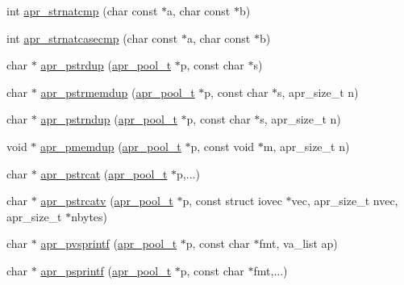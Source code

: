 \begin{DoxyCompactItemize}
\item 
int \hyperlink{group__apr__strings_gabe7e226c26e1535d787a7836b9c8d0a1}{apr\-\_\-strnatcmp} (char const $\ast$a, char const $\ast$b)
\item 
int \hyperlink{group__apr__strings_ga1708d51c4989934fec663b23366430f3}{apr\-\_\-strnatcasecmp} (char const $\ast$a, char const $\ast$b)
\item 
char $\ast$ \hyperlink{group__apr__strings_gabc79e99ff19abbd7cfd18308c5f85d47}{apr\-\_\-pstrdup} (\hyperlink{group__apr__pools_gaf137f28edcf9a086cd6bc36c20d7cdfb}{apr\-\_\-pool\-\_\-t} $\ast$p, const char $\ast$s)
\item 
char $\ast$ \hyperlink{group__apr__strings_ga0eae1185559578c0f9792413305eca25}{apr\-\_\-pstrmemdup} (\hyperlink{group__apr__pools_gaf137f28edcf9a086cd6bc36c20d7cdfb}{apr\-\_\-pool\-\_\-t} $\ast$p, const char $\ast$s, apr\-\_\-size\-\_\-t n)
\item 
char $\ast$ \hyperlink{group__apr__strings_gad17053ffe6604d908ae7cac33543a6b4}{apr\-\_\-pstrndup} (\hyperlink{group__apr__pools_gaf137f28edcf9a086cd6bc36c20d7cdfb}{apr\-\_\-pool\-\_\-t} $\ast$p, const char $\ast$s, apr\-\_\-size\-\_\-t n)
\item 
void $\ast$ \hyperlink{group__apr__strings_gac3886f14ecf5aed8fe4493087799685c}{apr\-\_\-pmemdup} (\hyperlink{group__apr__pools_gaf137f28edcf9a086cd6bc36c20d7cdfb}{apr\-\_\-pool\-\_\-t} $\ast$p, const void $\ast$m, apr\-\_\-size\-\_\-t n)
\item 
char $\ast$ \hyperlink{group__apr__strings_ga7bd80c95ffb7b3f96bc78e7b5b5b0045}{apr\-\_\-pstrcat} (\hyperlink{group__apr__pools_gaf137f28edcf9a086cd6bc36c20d7cdfb}{apr\-\_\-pool\-\_\-t} $\ast$p,...)
\item 
char $\ast$ \hyperlink{group__apr__strings_ga15d0853af252a894e288c682b8f84309}{apr\-\_\-pstrcatv} (\hyperlink{group__apr__pools_gaf137f28edcf9a086cd6bc36c20d7cdfb}{apr\-\_\-pool\-\_\-t} $\ast$p, const struct iovec $\ast$vec, apr\-\_\-size\-\_\-t nvec, apr\-\_\-size\-\_\-t $\ast$nbytes)
\item 
char $\ast$ \hyperlink{group__apr__strings_ga05248544edebc71070140d2ce5969c10}{apr\-\_\-pvsprintf} (\hyperlink{group__apr__pools_gaf137f28edcf9a086cd6bc36c20d7cdfb}{apr\-\_\-pool\-\_\-t} $\ast$p, const char $\ast$fmt, va\-\_\-list ap)
\item 
char $\ast$ \hyperlink{group__apr__strings_ga3eca76b8d293c5c3f8021e45eda813d8}{apr\-\_\-psprintf} (\hyperlink{group__apr__pools_gaf137f28edcf9a086cd6bc36c20d7cdfb}{apr\-\_\-pool\-\_\-t} $\ast$p, const char $\ast$fmt,...)

\end{DoxyCompactItemize}

